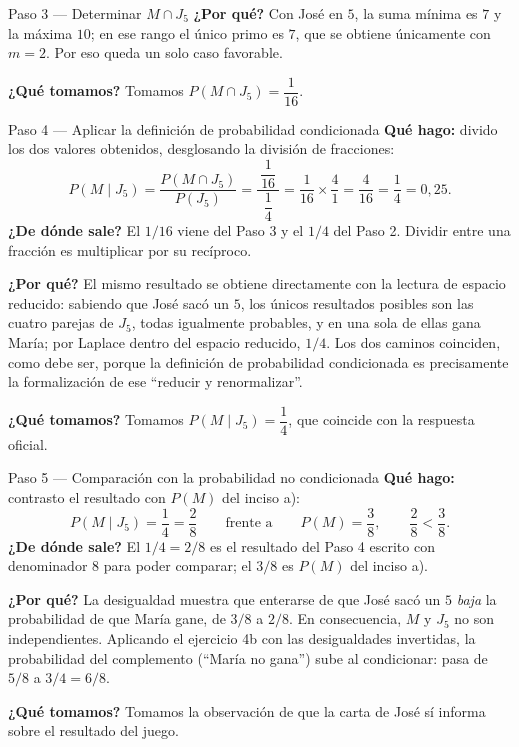 \documentclass[11pt]{article}
\begin{document}
\begin{sol}
\begin{paso}{Paso 3 --- Determinar $M\cap J_5$}
\textbf{¿Por qué?} Con José en $5$, la suma mínima es $7$ y la máxima $10$; en ese rango el
único primo es $7$, que se obtiene únicamente con $m=2$. Por eso queda un solo caso favorable.

\textbf{¿Qué tomamos?} Tomamos $P(M\cap J_5)=\dfrac{1}{16}$.
\end{paso}

\begin{paso}{Paso 4 --- Aplicar la definición de probabilidad condicionada}
\textbf{Qué hago:} divido los dos valores obtenidos, desglosando la división de fracciones:
\[
P(M\mid J_5)=\frac{P(M\cap J_5)}{P(J_5)}
=\frac{\ \dfrac{1}{16}\ }{\ \dfrac{1}{4}\ }
=\frac{1}{16}\times\frac{4}{1}
=\frac{4}{16}
=\frac{1}{4}=0{,}25 .
\]
\textbf{¿De dónde sale?} El $1/16$ viene del Paso 3 y el $1/4$ del Paso 2. Dividir entre una
fracción es multiplicar por su recíproco.

\textbf{¿Por qué?} El mismo resultado se obtiene directamente con la lectura de espacio
reducido: sabiendo que José sacó un $5$, los únicos resultados posibles son las cuatro parejas
de $J_5$, todas igualmente probables, y en una sola de ellas gana María; por Laplace dentro
del espacio reducido, $1/4$. Los dos caminos coinciden, como debe ser, porque la definición de
probabilidad condicionada es precisamente la formalización de ese ``reducir y renormalizar''.

\textbf{¿Qué tomamos?} Tomamos $P(M\mid J_5)=\dfrac{1}{4}$, que coincide con la respuesta
oficial.
\end{paso}

\begin{paso}{Paso 5 --- Comparación con la probabilidad no condicionada}
\textbf{Qué hago:} contrasto el resultado con $P(M)$ del inciso a):
\[
P(M\mid J_5)=\frac{1}{4}=\frac{2}{8}
\qquad\text{frente a}\qquad
P(M)=\frac{3}{8},
\qquad \frac{2}{8}<\frac{3}{8}.
\]
\textbf{¿De dónde sale?} El $1/4=2/8$ es el resultado del Paso 4 escrito con denominador $8$
para poder comparar; el $3/8$ es $P(M)$ del inciso a).

\textbf{¿Por qué?} La desigualdad muestra que enterarse de que José sacó un $5$ \emph{baja} la
probabilidad de que María gane, de $3/8$ a $2/8$. En consecuencia, $M$ y $J_5$ no son
independientes. Aplicando el ejercicio 4b con las desigualdades invertidas, la probabilidad
del complemento (``María no gana'') sube al condicionar: pasa de $5/8$ a $3/4=6/8$.

\textbf{¿Qué tomamos?} Tomamos la observación de que la carta de José sí informa sobre el
resultado del juego.
\end{paso}
\end{sol}
\end{document}
